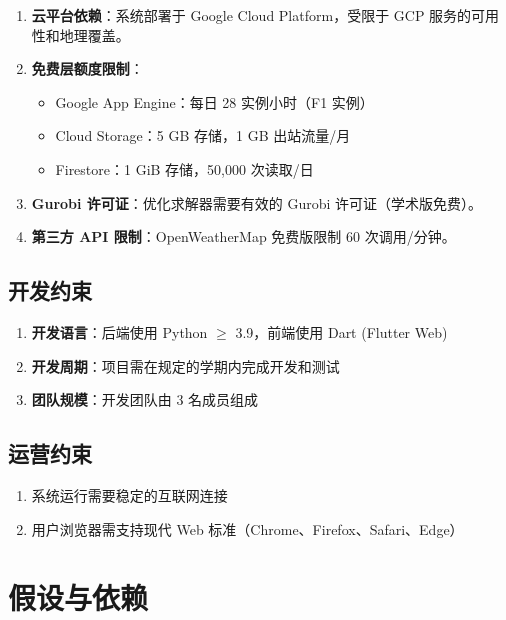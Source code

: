 \begin{enumerate}
    \item \textbf{云平台依赖}：系统部署于 Google Cloud Platform，受限于 GCP 服务的可用性和地理覆盖。

    \item \textbf{免费层额度限制}：
          \begin{itemize}
              \item Google App Engine：每日 28 实例小时（F1 实例）
              \item Cloud Storage：5 GB 存储，1 GB 出站流量/月
              \item Firestore：1 GiB 存储，50,000 次读取/日
          \end{itemize}

    \item \textbf{Gurobi 许可证}：优化求解器需要有效的 Gurobi 许可证（学术版免费）。

    \item \textbf{第三方 API 限制}：OpenWeatherMap 免费版限制 60 次调用/分钟。
\end{enumerate}

\subsection{开发约束}

\begin{enumerate}
    \item \textbf{开发语言}：后端使用 Python $\geq$ 3.9，前端使用 Dart (Flutter Web)
    \item \textbf{开发周期}：项目需在规定的学期内完成开发和测试
    \item \textbf{团队规模}：开发团队由 3 名成员组成
\end{enumerate}

\subsection{运营约束}

\begin{enumerate}
    \item 系统运行需要稳定的互联网连接
    \item 用户浏览器需支持现代 Web 标准（Chrome、Firefox、Safari、Edge）
\end{enumerate}

\section{假设与依赖}

